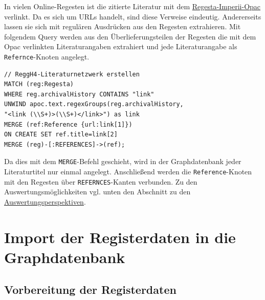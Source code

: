 \documentclass[ngerman,]{scrreprt}
\begin{document}
In vielen Online-Regesten ist die zitierte Literatur mit dem \href{http://opac.regesta-imperii.de/lang_de/}{Regesta-Imperii-Opac} verlinkt. Da es sich um URLs handelt, sind diese Verweise eindeutig. Andererseits lassen sie sich mit regulären Ausdrücken aus den Regesten extrahieren. Mit folgendem Query werden aus den Überlieferungsteilen der Regesten die mit dem Opac verlinkten Literaturangaben extrahiert und jede Literaturangabe als \texttt{Refernce}-Knoten angelegt.

\begin{verbatim}
// ReggH4-Literaturnetzwerk erstellen
MATCH (reg:Regesta)
WHERE reg.archivalHistory CONTAINS "link"
UNWIND apoc.text.regexGroups(reg.archivalHistory,
"<link (\\S+)>(\\S+)</link>") as link
MERGE (ref:Reference {url:link[1]})
ON CREATE SET ref.title=link[2]
MERGE (reg)-[:REFERENCES]->(ref);
\end{verbatim}

Da dies mit dem \texttt{MERGE}-Befehl geschieht, wird in der Graphdatenbank jeder Literaturtitel nur einmal angelegt. Anschließend werden die \texttt{Reference}-Knoten mit den Regesten über \texttt{REFERNCES}-Kanten verbunden. Zu den Auswertungsmöglichkeiten vgl. unten den Abschnitt zu den \protect\hyperlink{ux5cux23Auswertungsperspektiven}{Auswertungsperspektiven}.

\hypertarget{import-der-registerdaten-in-die-graphdatenbank}{%
\section{Import der Registerdaten in die Graphdatenbank}\label{import-der-registerdaten-in-die-graphdatenbank}}

\hypertarget{vorbereitung-der-registerdaten}{%
\subsection{Vorbereitung der Registerdaten}\label{vorbereitung-der-registerdaten}}
\end{document}
